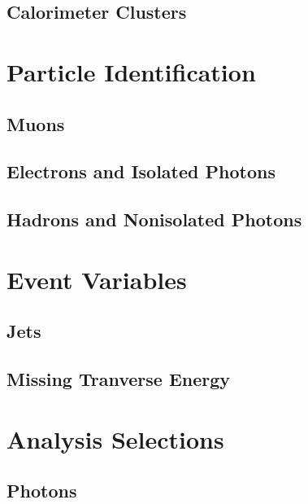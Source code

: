 \subsection{Calorimeter Clusters}
\label{sec:pf_clusters}

\section{Particle Identification}
\label{sec:pf_cands}

\subsection{Muons}
\label{sec:pf_muons}

\subsection{Electrons and Isolated Photons}
\label{sec:pf_egamma}

\subsection{Hadrons and Nonisolated Photons}
\label{sec:pf_hadrons}

\section{Event Variables}
\label{sec:pf_event}

\subsection{Jets}
\label{sec:pf_jets}

\subsection{Missing Tranverse Energy}
\label{sec:pf_met}

\iffalse
\section{Analysis Selections}
\label{sec:ana_sel}

\subsection{Photons}
\label{sec:ana_photons}

